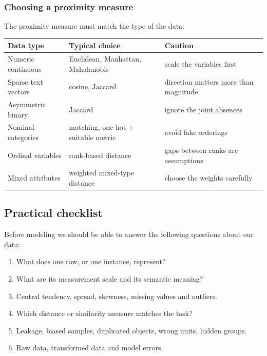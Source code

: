 \subsubsection{Choosing a proximity measure}
The proximity measure must match the type of the data:
\begin{center}
\small
\begin{tabular}{lll}
    \toprule
    Data type & Typical choice & Caution \\
    \midrule
    Numeric continuous & Euclidean, Manhattan, Mahalanobis & scale the variables first \\
    Sparse text vectors & cosine, Jaccard & direction matters more than magnitude \\
    Asymmetric binary & Jaccard & ignore the joint absences \\
    Nominal categories & matching, one-hot + suitable metric & avoid fake orderings \\
    Ordinal variables & rank-based distance & gaps between ranks are assumptions \\
    Mixed attributes & weighted mixed-type distance & choose the weights carefully \\
    \bottomrule
\end{tabular}
\end{center}

\subsection{Practical checklist}
Before modeling we should be able to answer the following questions about our data:
\begin{enumerate}
    \item {} What does one row, or one instance, represent?
    \item {} What are its measurement scale and its semantic meaning?
    \item {} Central tendency, spread, skewness, missing values and outliers.
    \item {} Which distance or similarity measure matches the task?
    \item {} Leakage, biased samples, duplicated objects, wrong units, hidden groups.
    \item {} Raw data, transformed data and model errors.
\end{enumerate}

